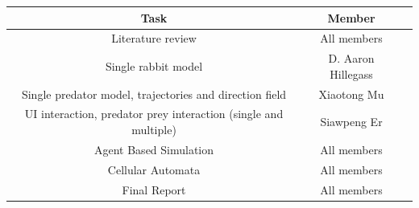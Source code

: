 \documentclass{article}
\begin{document}
\begin{normalsize}
		\begin{center}
			\begin{tabular}{ |c|c|c| } 
				\hline
				Task & Member  \\ 
				\hline
				Literature review & All members\\			
				Single rabbit model & D. Aaron Hillegass\\ 
				Single predator model, trajectories and direction field & Xiaotong Mu\\
				UI interaction, predator prey interaction (single and multiple) & Siawpeng Er\\
				Agent Based Simulation & All members\\
				Cellular Automata & All members\\
				Final Report & All members \\
				\hline
			\end{tabular}
		\end{center}

		
		
		
	\end{normalsize}
	
\end{document}
